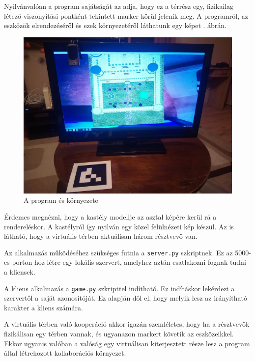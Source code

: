 Nyilvánvalóan a program sajátságát az adja, hogy ez a térrész egy, fizikailag létező viszonyítási pontként tekintett marker körül jelenik meg.
A programról, az eszközök elrendezéséről és ezek környezetéről láthatunk egy képet . ábrán.

\begin{figure}[h!]
	\centering
	\includegraphics[width=\textwidth]{images/real.jpg}
	\caption{A program és környezete}
	\label{fig:real}
\end{figure}

Érdemes megnézni, hogy a kastély modellje az asztal képére kerül rá a rendereléskor.
A kastélyról így nyilván egy közel felülnézeti kép készül.
Az is látható, hogy a virtuális térben aktuálisan három résztvevő van.

Az alkalmazás működéséhez szükséges futnia a \texttt{server.py} szkriptnek.
Ez az 5000-es porton hoz létre egy lokális szervert, amelyhez aztán csatlakozni fognak tudni a kliensek.

A kliens alkalmazás a \texttt{game.py} szkripttel indítható.
Ez indításkor lekérdezi a szervertől a saját azonosítóját.
Ez alapján dől el, hogy melyik lesz az irányítható karakter a kliens számára.

A virtuális térben való kooperáció akkor igazán szemléletes, hogy ha a résztvevők fizikálisan egy térben vannak, és ugyanazon markert követik az eszközeikkel.
Ekkor ugyanis valóban a valóság egy virtuálisan kiterjesztett része lesz a program által létrehozott kollaborációs környezet.
